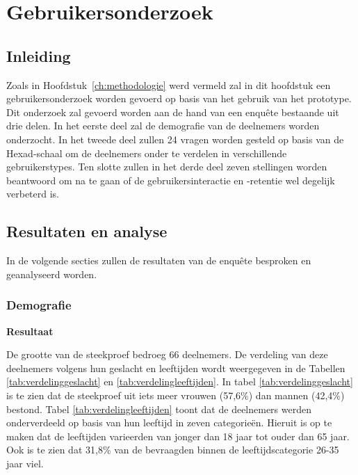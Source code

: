 
\chapter{Gebruikersonderzoek}
\label{ch:gebruikersonderzoek}

\section{Inleiding}

Zoals in Hoofdstuk~\ref{ch:methodologie} werd vermeld zal in dit hoofdstuk een gebruikersonderzoek worden gevoerd op basis van het gebruik van het prototype. Dit onderzoek zal gevoerd worden aan de hand van een enquête bestaande uit drie delen. In het eerste deel zal de demografie van de deelnemers worden onderzocht. In het tweede deel zullen 24 vragen worden gesteld op basis  van de Hexad-schaal om de deelnemers onder te verdelen in verschillende gebruikerstypes. Ten slotte zullen in het derde deel zeven stellingen worden beantwoord om na te gaan of de gebruikersinteractie en -retentie wel degelijk verbeterd is.

\section{Resultaten en analyse}

In de volgende secties zullen de resultaten van de enquête besproken en geanalyseerd worden.

\subsection{Demografie}

\textbf{Resultaat}

De grootte van de steekproef bedroeg 66 deelnemers. De verdeling van deze deelnemers volgens hun geslacht en leeftijden wordt weergegeven in de Tabellen \ref{tab:verdelinggeslacht} en \ref{tab:verdelingleeftijden}. In tabel \ref{tab:verdelinggeslacht} is te zien dat de steekproef uit iets meer vrouwen (57,6\%) dan mannen (42,4\%) bestond. Tabel \ref{tab:verdelingleeftijden} toont dat de deelnemers werden onderverdeeld op basis van hun leeftijd in zeven categorieën. Hieruit is op te maken dat de leeftijden varieerden van jonger dan 18 jaar tot ouder dan 65 jaar. Ook is te zien dat 31,8\% van de bevraagden binnen de leeftijdscategorie 26-35 jaar viel.

